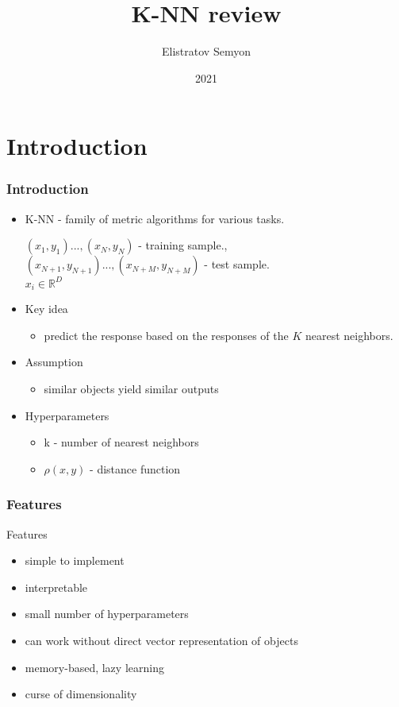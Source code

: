 \documentclass{beamer}
\title{K-NN review}
\author{Elistratov Semyon}
\institute{MMF CMC MSU}
\date{2021}
\begin{document}
	\frame{\titlepage}
	\section{Introduction}
		\begin{frame}
			\frametitle{Introduction}
			\begin{itemize}
				 
				\item K-NN - family of metric algorithms for various tasks.
			
			$(x_1, y_1) ..., (x_N, y_N)$ - training sample., \\ 
			$(x_{N+1}, y_{N+1}) ..., (x_{N+M}, y_{N+M})$ - test sample. \\
			$x_i \in \mathbb{R}^D$
			
			\item Key idea
				\begin{itemize}
					\item 	predict the response based on the responses of the $K$ nearest neighbors.
				\end{itemize}
			\item Assumption
			\begin{itemize}
				\item similar objects yield similar outputs
			\end{itemize}
			\item Hyperparameters
			\begin{itemize}
				\item k - number of nearest neighbors
				\item $\rho(x, y)$ - distance function
			\end{itemize}
		\end{itemize}
		\end{frame}
	

		\begin{frame}
			\frametitle{Features}
			Features
			\begin{itemize}
				\item simple to implement
				\item interpretable
				\item small number of hyperparameters
				\item can work without direct vector representation of objects
				\item memory-based, lazy learning
				\item curse of dimensionality
			\end{itemize}
		\end{frame}
		
\end{document}
